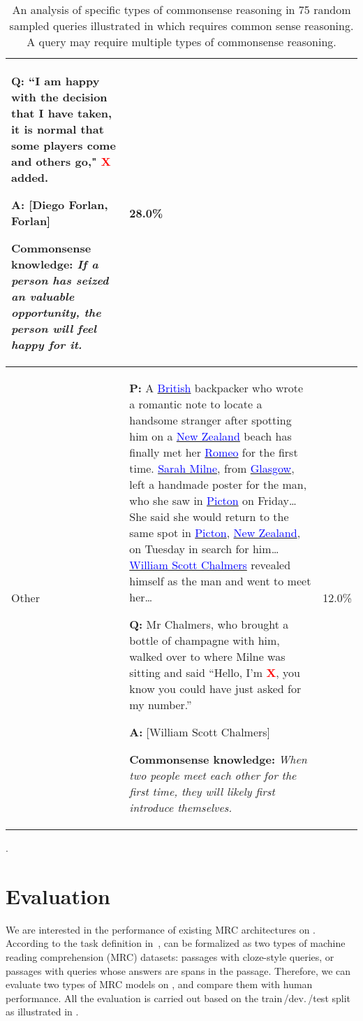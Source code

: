 \begin{table*}[!t]
\begin{tabular}{@{}m{2cm}m{12cm}r@{}}
\noindent\textbf{Q:} ``I am happy with the decision that I have taken, it is normal that some players come and others go," \textcolor{red}{$\mathbf{X}$} added.

\noindent\textbf{A:} [Diego Forlan, Forlan]

\noindent\textbf{Commonsense knowledge:} \emph{If a person has seized an valuable opportunity, the person will feel happy for it.}
& 28.0\%                            \\ \midrule
Other &         
\noindent\textbf{P:} 
A \underline{\textcolor{blue}{British}} backpacker who wrote a romantic note to locate a handsome stranger after spotting him on a \underline{\textcolor{blue}{New Zealand}} beach has finally met her \underline{\textcolor{blue}{Romeo}} for the first time. \underline{\textcolor{blue}{Sarah Milne}}, from \underline{\textcolor{blue}{Glasgow}}, left a handmade poster for the man, who she saw in \underline{\textcolor{blue}{Picton}} on Friday\ldots
She said she would return to the same spot in \underline{\textcolor{blue}{Picton}}, \underline{\textcolor{blue}{New Zealand}}, on Tuesday in search for him\ldots
 \underline{\textcolor{blue}{William Scott Chalmers}} revealed himself as the man and went to meet her\ldots

\noindent\textbf{Q:} Mr Chalmers, who brought a bottle of champagne with him, walked over to where Milne was sitting and said ``Hello, I'm \textcolor{red}{$\mathbf{X}$}, you know you could have just asked for my number.''

\noindent\textbf{A:} [William Scott Chalmers]

\noindent\textbf{Commonsense knowledge:} \emph{When two people meet each other for the first time, they will likely first introduce themselves.}
& 12.0\%                            \\ \bottomrule
\end{tabular}
\caption{An analysis of specific types of commonsense reasoning in 75 random sampled queries illustrated in  which requires common sense reasoning. A query may require multiple types of commonsense reasoning.}
\label{tab:commonsense-types}.
\end{table*}

\section{Evaluation}
\label{sec:evaluation}

We are interested in the performance of existing MRC architectures on \ReCoRD.
According to the task definition in~, \ReCoRD can be formalized as two types of machine reading comprehension (MRC) datasets: passages with cloze-style queries, or passages with queries whose answers are spans in the passage.
Therefore, we can evaluate two types of MRC models on \ReCoRD, and compare them with human performance.
All the evaluation is carried out based on the train\,/dev.\,/test split as illustrated in .

